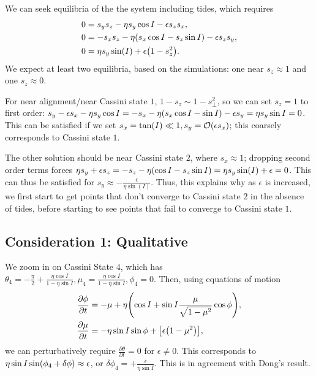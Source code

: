 \documentclass[11pt,
        usenames, %
        dvipsnames %
    ]{article}
\newcommand*{\pd}[2]{\frac{\partial#1}{\partial#2}}
\DeclarePairedDelimiter\p{\lparen}{\rparen}
\DeclarePairedDelimiter\s{\lbrack}{\rbrack}
\begin{document}
We can seek equilibria of the the system including tides, which requires
\begin{align*}
    0 &= s_ys_z - \eta s_y\cos I - \epsilon s_zs_x,\\
    0 &= -s_xs_z - \eta\p*{s_x \cos I - s_z \sin I} - \epsilon s_zs_y,\\
    0 &= \eta s_y\sin(I) + \epsilon \p*{1 - s_z^2}.
\end{align*}
We expect at least two equilibria, based on the simulations: one near $s_z
\approx 1$ and one $s_z \approx 0$.

For near alignment/near Cassini state $1$, $1 - s_z \sim 1 - s_{\perp}^2$, so we
can set $s_z = 1$ to first order: $s_y - \epsilon s_x - \eta s_y \cos I = -s_x -
\eta\p*{s_x \cos I - \sin I} - \epsilon s_y = \eta s_y \sin I = 0$. This can be
satisfied if we set $s_x = \tan(I) \ll 1, s_y = \mathcal{O}\p*{\epsilon s_x}$;
this coarsely corresponds to Cassini state $1$.

The other solution should be near Cassini state $2$, where $s_x \approx 1$;
dropping second order terms forces $\eta s_y + \epsilon s_z = -s_z -
\eta\p*{\cos I - s_z\sin I} = \eta s_y \sin(I) + \epsilon = 0$. This can thus be
satisfied for $s_y \approx -\frac{\epsilon}{\eta \sin(I)}$. Thus, this explains
why as $\epsilon$ is increased, we first start to get points that don't converge
to Cassini state $2$ in the absence of tides, before starting to see points that
fail to converge to Cassini state $1$.

\subsection{Consideration 1: Qualitative}

We zoom in on Cassini State $4$, which has $\theta_4 =
-\frac{\pi}{2} + \frac{\eta \cos I}{1 - \eta \sin I}, \mu_4 = \frac{\eta \cos
I}{1 - \eta \sin I}, \phi_4 = 0$. Then, using
equations of motion
\begin{align}
    \pd{\phi}{t} &= -\mu + \eta\p*{\cos I + \sin I \frac{\mu}{\sqrt{1 - \mu^2}}
        \cos \phi} ,\\
    \pd{\mu}{t} &= -\eta \sin I \sin \phi + \s*{\epsilon \p*{1 - \mu^2}},
\end{align}
we can perturbatively require $\pd{\theta}{t} = 0$ for $\epsilon \neq 0$. This
corresponds to $\eta \sin I \sin \p*{\phi_4 + \delta \phi} \approx \epsilon$, or
$\delta \phi_4 = +\frac{\epsilon}{\eta \sin I}$. This is in agreement with
Dong's result.
\end{document}
